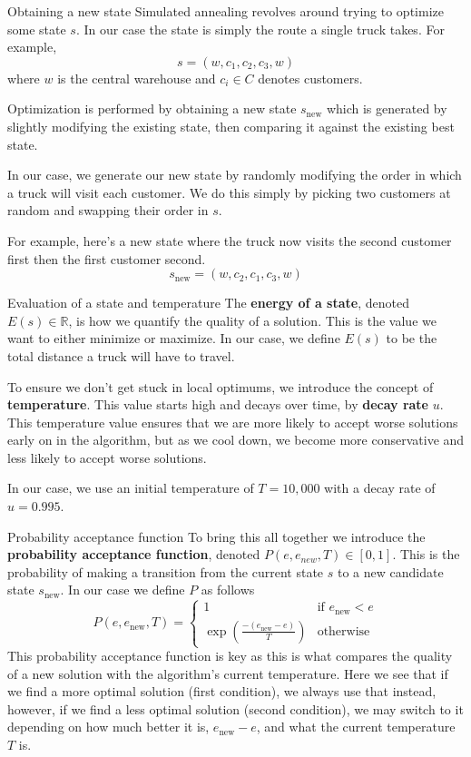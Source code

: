 \documentclass[aspectratio=169,final]{beamer}
\begin{document}
\begin{frame}{Obtaining a new state}
    Simulated annealing revolves around trying to optimize some state $s$. In our case the state is simply the route a single truck takes. For example,
    \[
        s=(w,c_1,c_2,c_3,w)
    \]
    where $w$ is the central warehouse and $c_i\in C$ denotes customers.

    Optimization is performed by obtaining a new state $s_\text{new}$ which is generated by slightly modifying the existing state, then comparing it against the existing best state.

    In our case, we generate our new state by randomly modifying the order in which a truck will visit each customer. We do this simply by picking two customers at random and swapping their order in $s$.

    For example, here's a new state where the truck now visits the second customer first then the first customer second.
    \[
        s_\text{new}=(w,c_2,c_1,c_3,w)
    \]
\end{frame}

\begin{frame}{Evaluation of a state and temperature}
    The \textbf{energy of a state}, denoted $E(s)\in\mathbb{R}$, is how we quantify the quality of a solution. This is the value we want to either minimize or maximize. In our case, we define $E(s)$ to be the total distance a truck will have to travel.

    To ensure we don't get stuck in local optimums, we introduce the concept of \textbf{temperature}. This value starts high and decays over time, by \textbf{decay rate} $u$. This temperature value ensures that we are more likely to accept worse solutions early on in the algorithm, but as we cool down, we become more conservative and less likely to accept worse solutions.

    In our case, we use an initial temperature of $T=10,000$ with a decay rate of $u=0.995$.
\end{frame}

\begin{frame}{Probability acceptance function}
    To bring this all together we introduce the \textbf{probability acceptance function}, denoted $P(e,e_{new},T)\in[0,1]$. This is the probability of making a transition from the current state $s$ to a new candidate state $s_\text{new}$. In our case we define $P$ as follows
    \[
        P(e,e_\text{new},T)=\begin{cases}
            1 & \text{if }e_\text{new}<e \\
            \displaystyle\exp\left(\frac{-(e_\text{new}-e)}{T}\right) & \text{otherwise}
        \end{cases}
    \]
    This probability acceptance function is key as this is what compares the quality of a new solution with the algorithm's current temperature. Here we see that if we find a more optimal solution (first condition), we always use that instead, however, if we find a less optimal solution (second condition), we may switch to it depending on how much better it is, $e_\text{new}-e$, and what the current temperature $T$ is.
\end{frame}
\end{document}
